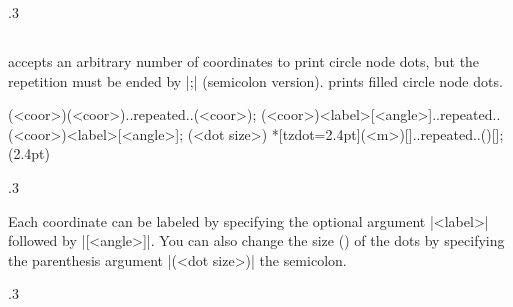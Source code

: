 \begin{tzcode}{.3}
\end{tzcode}



\subsection{\protect\cmd{\tzdots(*)}}
\label{ssi:tzdots}

\icmd{\tzdots} accepts an arbitrary number of coordinates to print circle node dots, but the repetition must be ended by |;| (semicolon version).
\icmd{\tzdots*} prints filled circle node dots.

\begin{tzdef}{}
\tzdots*(<coor>)(<coor>)..repeated..(<coor>);
\tzdots*[<opt>](<coor>){<label>}[<angle>]..repeated..
               (<coor>){<label>}[<angle>]; (<dot size>)
 *[tzdot=2.4pt](<m>){}[]..repeated..(){}[]; (2.4pt)
\end{tzdef}


\begin{tzcode}{.3}
\end{tzcode}

Each coordinate can be labeled by specifying the optional argument |{<label>}| followed by |[<angle>]|. You can also change the size () of the dots by specifying the  parenthesis argument |(<dot size>)|  the semicolon.

\begin{tzcode}{.3}
\end{tzcode}


